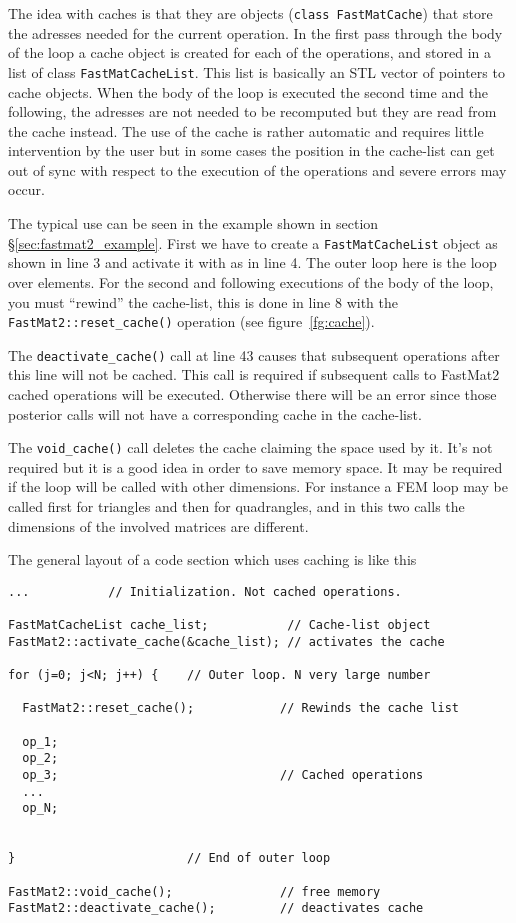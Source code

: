 The idea with caches is that they are objects
(\verb+class FastMatCache+) that store the adresses needed for the
current operation. In the first pass through the body of the loop a
cache object is created for each of the operations, and stored in a
list of class \verb+FastMatCacheList+. This list is basically an STL
vector of pointers to cache objects. When the body of the loop is
executed the second time and the following, the adresses are not
needed to be recomputed but they are read from the cache instead. The
use of the cache is rather automatic and requires little intervention
by the user but in some cases the position in the cache-list can get
out of sync with respect to the execution of the operations and severe
errors may occur.

The typical use can be seen in the example shown in section
\S\ref{sec:fastmat2_example}. First we have to create a
\verb+FastMatCacheList+ object as shown in line 3 and activate it with
as in line 4. The outer loop here is the loop over elements. For the
second and following executions of the body of the loop, you must
``rewind'' the cache-list, this is done in line 8 with the
\verb+FastMat2::reset_cache()+ operation (see figure~\ref{fg:cache}).

The \verb+deactivate_cache()+ call at line 43 causes that subsequent
operations after this line will not be cached. This call is required
if subsequent calls to FastMat2 cached operations will be
executed. Otherwise there will be an error since those posterior calls
will not have a corresponding cache in the cache-list. 

The \verb+void_cache()+ call deletes the cache claiming the space used
by it. It's not required but it is a good idea in order to save memory
space. It may be required if the loop will be called with other
dimensions. For instance a FEM loop may be called first for triangles
and then for quadrangles, and in this two calls the dimensions of the
involved matrices are different. 

The general layout of a code section which uses caching is like this
%
\begin{verbatim}
...           // Initialization. Not cached operations. 

FastMatCacheList cache_list;           // Cache-list object
FastMat2::activate_cache(&cache_list); // activates the cache

for (j=0; j<N; j++) {    // Outer loop. N very large number

  FastMat2::reset_cache();            // Rewinds the cache list
          
  op_1;
  op_2;
  op_3;                               // Cached operations 
  ...                                       
  op_N;
  
   
}                        // End of outer loop 

FastMat2::void_cache();               // free memory
FastMat2::deactivate_cache();         // deactivates cache
\end{verbatim}

